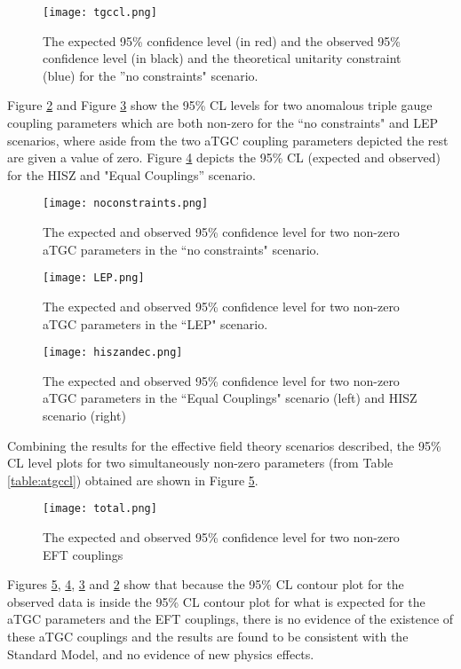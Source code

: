 \documentclass[11pt,oneside,a4paper]{article}
\begin{document}
\begin{figure}[H]
	\texttt{[image: tgccl.png]}
	\caption{The expected 95\% confidence level (in red) and the observed 95\% confidence level (in black) and the theoretical unitarity constraint (blue) for the ''no constraints" scenario.}
	\label{fig:atgceft}
\end{figure}

Figure \ref{fig:noconstraints} and Figure \ref{fig:LEP}  show the 95\% CL levels for two anomalous triple gauge coupling parameters which are both non-zero for the ``no constraints" and LEP scenarios, where aside from the two aTGC coupling parameters depicted the rest are given a value of zero. Figure \ref{fig:hiszandec} depicts the 95\% CL (expected and observed) for the HISZ and "Equal Couplings'' scenario. 


\begin{figure}[H]
	\texttt{[image: noconstraints.png]}
	\caption{The expected and observed 95\% confidence level for two non-zero aTGC parameters in the ``no constraints" scenario.}
	\label{fig:noconstraints}
\end{figure}

\begin{figure}[H]
	\texttt{[image: LEP.png]}
	\caption{The expected and observed 95\% confidence level for two non-zero aTGC parameters in the ``LEP" scenario.}
	\label{fig:LEP}
\end{figure}

\begin{figure}[H]
	\texttt{[image: hiszandec.png]}
	\caption{The expected and observed 95\% confidence level for two non-zero aTGC parameters in the ``Equal Couplings" scenario (left) and HISZ scenario (right)}
	\label{fig:hiszandec}
\end{figure}

Combining the results for the effective field theory scenarios described, the 95\% CL level plots for two simultaneously non-zero parameters (from Table \ref{table:atgccl}) obtained are shown in Figure \ref{fig:total}.   

\begin{figure}[H]
	\texttt{[image: total.png]}
	\caption{The expected and observed 95\% confidence level for two non-zero EFT couplings}
	\label{fig:total}
\end{figure}

Figures \ref{fig:total}, \ref{fig:hiszandec}, \ref{fig:LEP} and \ref{fig:noconstraints} show that because the 95\% CL contour plot for the observed data is inside the 95\% CL contour plot for what is expected for the aTGC parameters and the EFT couplings, there is no evidence of the existence of these aTGC couplings and the results are found to be consistent with the Standard Model, and no evidence of new physics effects.
\end{document}
